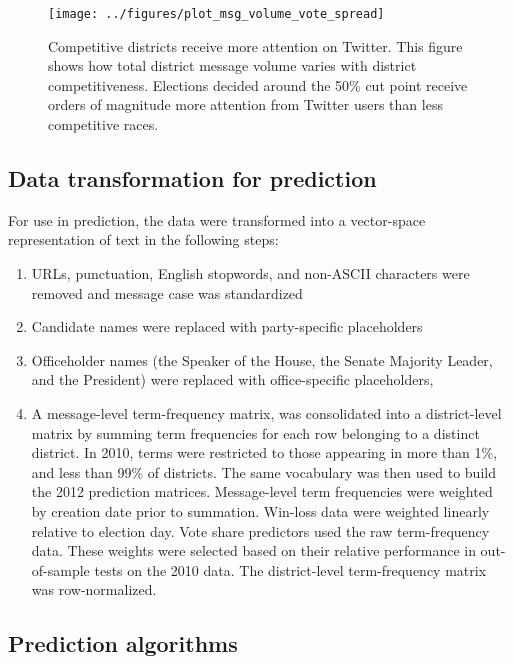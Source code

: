 \documentclass{acm_proc_article-sp}
\begin{document}
\begin{figure}[ht]
  \centering
  \texttt{[image: ../figures/plot\_msg\_volume\_vote\_spread]}
  \caption{Competitive districts receive more attention on
    Twitter. This figure shows how total district message volume
    varies with district competitiveness. Elections decided around the
  50\% cut point receive orders of magnitude more attention from
  Twitter users than less competitive races.}
  \label{fig:msg-volume-vote-spread}
\end{figure}



\subsection{Data transformation for prediction}
\label{sec:data-transf-pred}

For use in prediction, the data were transformed into a vector-space
representation of text in the following steps:
\begin{enumerate}
\item URLs, punctuation, English stopwords, and non-ASCII characters were removed and
  message case was standardized
\item Candidate names were replaced with party-specific placeholders
\item Officeholder names (the Speaker of the House, the Senate
  Majority Leader, and the President) were replaced with
  office-specific placeholders,
\item A message-level term-frequency matrix,
  was consolidated into a district-level matrix by summing term
  frequencies for each row belonging to a distinct district. In 2010,
  terms were restricted to those appearing in more than 1\%, and less
  than 99\% of districts. The same vocabulary was then used to build
  the 2012 prediction matrices. Message-level term frequencies were
  weighted by creation date prior to summation. Win-loss data were
   weighted linearly relative to election
  day. Vote share 
  predictors used the raw term-frequency data. These weights were
  selected based on their relative performance in out-of-sample tests
  on the 2010 data. The district-level term-frequency matrix was row-normalized.
\end{enumerate}

\subsection{Prediction algorithms}
\label{sec:pred-algor}
\end{document}
